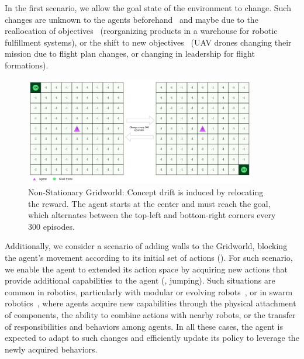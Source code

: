 In the first scenario, we allow the goal state of the environment to change. Such changes are unknown 
to the agents beforehand~\cite{cardozo21} and maybe due to the reallocation of 
objectives~\cite{khetarpal2022continualreinforcementlearningreview} (\eg reorganizing products in a 
warehouse for robotic fulfillment systems), or the shift to new objectives~\cite{florensa18} (\eg UAV drones 
changing their mission due to flight plan changes, or changing in leadership for flight formations).

\begin{figure}[hptb]
    \centering
    \includegraphics[width=0.9\textwidth]{figures/rewards_change}
    \caption{Non-Stationary Gridworld: Concept drift is induced by relocating the reward. The agent starts at the center and must reach the goal, which alternates between the top-left and bottom-right corners every 300 episodes.}
    \label{fig:r-change}
\end{figure}

Additionally, we consider a scenario of adding walls to the Gridworld, blocking the agent's movement 
according to its initial set of actions (). For such scenario, we enable the agent 
to  extended its action space by acquiring new actions that provide additional capabilities to the agent 
(\ie, jumping). Such situations are common in robotics, particularly with modular or evolving robots~\cite{eiben20evolving,miras20environmental}, or in swarm robotics~\cite{schranz20swarm}, where agents acquire new capabilities through the physical attachment of components, the ability to combine actions with nearby robots, or the transfer of responsibilities and behaviors among agents. In all these cases, the agent is expected to adapt to such changes and efficiently update its policy to leverage the newly acquired behaviors.


\endinput

